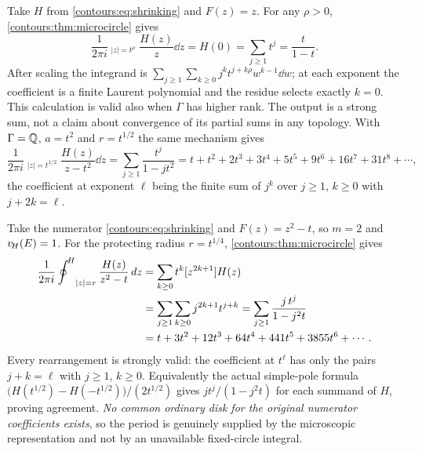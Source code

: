 \documentclass[11pt,letterpaper]{article}
\theoremstyle{definition}
\theoremstyle{remark}
\newcommand{\HCoint}{\mathop{\oint^{\!H}}\nolimits}
\numberwithin{equation}{section}
\begin{document}
\begin{example}
\label{contours:ex:radiusfreevalue}
Take $H$ from \eqref{contours:eq:shrinking} and $F(z)=z$. For any $\rho>0$,
\cref{contours:thm:microcircle} gives
\begin{equation}\label{contours:eq:radiusfreevalue}
  \frac1{2\pi i}\HCoint_{|z|=t^\rho}\frac{H(z)}{z}\dd z
  =H(0)=\sum_{j\ge1}t^j=\frac{t}{1-t} .
\end{equation}
After scaling the integrand is
$\sum_{j\ge1}\sum_{k\ge0}j^kt^{j+k\rho}w^{k-1}\dd w$; at each exponent the
coefficient is a finite Laurent polynomial and the residue selects exactly $k=0$.
This calculation is valid also when $\Gamma$ has higher rank. The output is a strong
sum, not a claim about convergence of its partial sums in any topology. With
$\Gamma=\mathbb Q$, $a=t^2$ and $r=t^{1/2}$ the same mechanism gives
\begin{equation}\label{contours:eq:radiusfreecauchy}
  \frac1{2\pi i}\HCoint_{|z|=t^{1/2}}\frac{H(z)}{z-t^2}\dd z
  =\sum_{j\ge1}\frac{t^j}{1-jt^2}
  =t+t^2+2t^3+3t^4+5t^5+9t^6+16t^7+31t^8+\cdots,
\end{equation}
the coefficient at exponent $\ell$ being the finite sum of $j^k$ over $j\ge1$,
$k\ge0$ with $j+2k=\ell$.
\end{example}

\begin{example}
\label{contours:ex:radiusfreepole}
Take the numerator \eqref{contours:eq:shrinking} and $F(z)=z^2-t$, so $m=2$ and
$v_{\!H}(E)=1$. For the protecting radius $r=t^{1/4}$,
\cref{contours:thm:microcircle} gives
\begin{align}\label{contours:eq:radiusfreeexample}
  \frac1{2\pi i}\HCoint_{|z|=r}\frac{H(z)}{z^2-t}\dd z
  &=\sum_{k\ge0}t^k[z^{2k+1}]H(z)\notag\\
  &=\sum_{j\ge1}\sum_{k\ge0}j^{2k+1}t^{j+k}
   =\sum_{j\ge1}\frac{j\,t^j}{1-j^2t}\notag\\
  &=t+3t^2+12t^3+64t^4+441t^5+3855t^6+\cdots .
\end{align}
Every rearrangement is strongly valid: the coefficient at $t^\ell$ has only the
pairs $j+k=\ell$ with $j\ge1$, $k\ge0$. Equivalently the actual simple-pole formula
$\bigl(H(t^{1/2})-H(-t^{1/2})\bigr)/(2t^{1/2})$ gives $jt^j/(1-j^2t)$ for each
summand of $H$, proving agreement. \emph{No common ordinary disk for the original
numerator coefficients exists}, so the period is genuinely supplied by the
microscopic representation and not by an unavailable fixed-circle integral.
\end{example}
\end{document}
